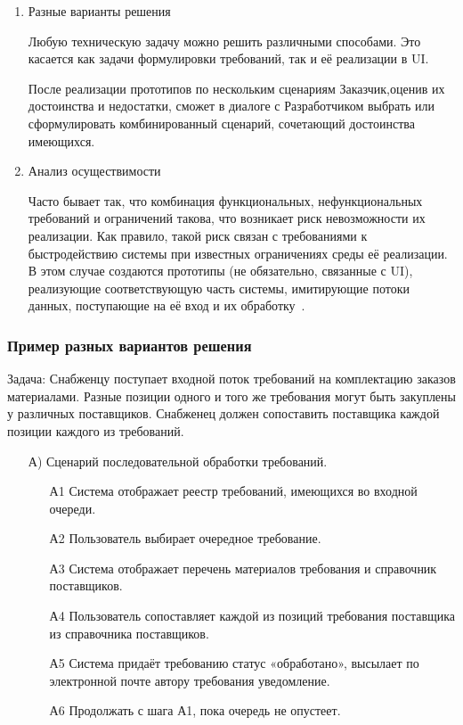 \documentclass{../industrial-development}
\begin{document}
{\begin{enumerate}
\item \alert{Разные варианты решения}

Любую техническую задачу можно решить
различными способами. Это касается как задачи формулировки требований, так и её
реализации в UI.

После реализации прототипов по нескольким сценариям Заказчик,оценив их достоинства
и недостатки, сможет в диалоге с Разработчиком выбрать или сформулировать комбинированный сценарий, сочетающий достоинства имеющихся.

\item \alert{Анализ осуществимости}

Часто бывает так, что комбинация функциональных,
нефункциональных требований и ограничений такова, что возникает риск невозможности
их реализации. Как правило, такой риск связан с требованиями к быстродействию
системы при известных ограничениях среды её реализации. В этом случае создаются
прототипы (не обязательно, связанные с UI), реализующие соответствующую часть
системы, имитирующие потоки данных, поступающие на её вход и их обработку~\cite[с.~51-52]{Maglinec}.

\end{enumerate}
\begin{frame} \frametitle {Пример разных вариантов решения}
\alert{Задача}: Снабженцу поступает входной поток требований на
комплектацию заказов материалами. Разные позиции одного и того же требования могут
быть закуплены у различных поставщиков. Снабженец должен сопоставить поставщика
каждой позиции каждого из требований.

\begin{itemize}
\item[А)] Сценарий последовательной обработки требований.
\begin{itemize}
\item[А1] Система отображает реестр требований, имеющихся во входной очереди.
\item[А2] Пользователь выбирает очередное требование.
\item[А3] Система отображает перечень материалов требования и справочник
поставщиков.
\item[А4] Пользователь сопоставляет каждой из позиций требования поставщика из
справочника поставщиков.
\item[А5] Система придаёт требованию статус «обработано», высылает по электронной
почте автору требования уведомление.
\item[А6] Продолжать с шага А1, пока очередь не опустеет.
\end{itemize}
\end{itemize}
\end{frame}

}
\end{document}
